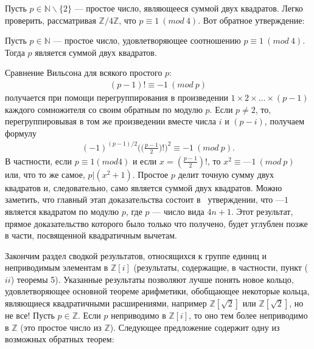 Пусть $p \in \mathds{N} \backslash \{2\}$ — простое число, являющееся суммой двух квадратов. Легко проверить, рассматривая $\mathds{Z}/4\mathds{Z}$, что $p \equiv 1\:(mod\:4)$. Вот обратное утверждение: 

\begin{sled}
\textit{\indent} Пусть $p \in \mathds{N}$ — простое число, удовлетворяющее соотношению $p \equiv 1\:(mod\:4)$. Тогда $p$ является суммой двух квадратов.
\end{sled}

\begin{myproof}
Сравнение Вильсона для всякого простого $p$:
\begin{align*}
(p - 1)!\equiv -1\:(mod\:p)
\end{align*}
получается при помощи перегруппирования в произведении $1 \times 2 \times \dots \times (p-1)$ каждого сомножителя со своим обратным по модулю $p$. Если $p \neq 2$, то, перегруппировывая в том же произведении вместе числа $i$ и $(p - i)$, получаем формулу
\begin{align*}
(-1)^{(p-1)/2} \Biggl(\Biggl(\frac{p-1}{2}\Biggr)!\Biggr)^2 \equiv -1\:(mod\:p)\text{.}
\end{align*}
В частности, если $p \equiv 1 (mod 4)$ и если $x = (\frac{p-1}{2})!$, то $x^2 \equiv —1\:(mod\:p)$ или, что то же самое, $p | (x^2 + 1)$. Простое $p$ делит точную сумму двух квадратов и, следовательно, само является суммой двух квадратов. \newline Можно заметить, что главный этап доказательства состоит в~ утверждении, что $—1$ является квадратом по модулю $p$, где $p$ — число вида $4n + 1$. Этот результат, прямое доказательство которого было только что получено, будет углублен позже в части, посвященной квадратичным вычетам.
\end{myproof}

\newpage

Закончим раздел сводкой результатов, относящихся к группе единиц и неприводимым элементам в $\mathds{Z}[i]$ (результаты, содержащие, в частности, пункт ($ii$) теоремы 5). Указанные результаты позволяют лучше понять новое кольцо, удовлетворяющее основной теореме арифметики, обобщающее некоторые кольца, являющиеся квадратичными расширениями, например $\mathds{Z}[\sqrt{2}]$ или $\mathds{Z}[\sqrt{2}]$, но не все! \newline \indent Пусть $p \in \mathds{Z}$. Если $p$ неприводимо в $\mathds{Z}[i]$, то оно тем более неприводимо в $\mathds{Z}$ (это простое число из $\mathds{Z}$). Следующее предложение содержит одну из возможных обратных теорем:

